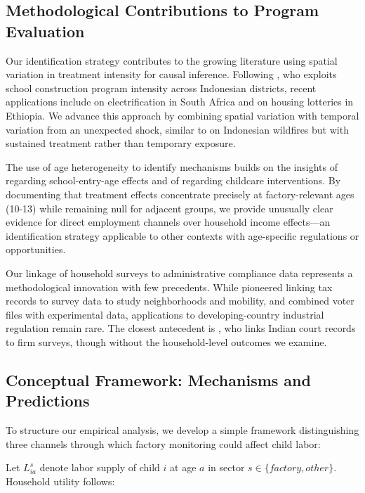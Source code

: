 \documentclass[12pt]{article}
\begin{document}
\subsection{Methodological Contributions to Program Evaluation}

Our identification strategy contributes to the growing literature using spatial variation in treatment intensity for causal inference. Following \citet{duflo2001schooling}, who exploits school construction program intensity across Indonesian districts, recent applications include \citet{dinkelman2011effects} on electrification in South Africa and \citet{franklin2018location} on housing lotteries in Ethiopia. We advance this approach by combining spatial variation with temporal variation from an unexpected shock, similar to \citet{jayachandran2009air} on Indonesian wildfires but with sustained treatment rather than temporary exposure.

The use of age heterogeneity to identify mechanisms builds on the insights of \citet{cascio2008first} regarding school-entry-age effects and of \citet{cornelissen2016benefits} regarding childcare interventions. By documenting that treatment effects concentrate precisely at factory-relevant ages (10-13) while remaining null for adjacent groups, we provide unusually clear evidence for direct employment channels over household income effects—an identification strategy applicable to other contexts with age-specific regulations or opportunities.

Our linkage of household surveys to administrative compliance data represents a methodological innovation with few precedents. While \citet{chetty2016effects} pioneered linking tax records to survey data to study neighborhoods and mobility, and \citet{berg2018individual} combined voter files with experimental data, applications to developing-country industrial regulation remain rare. The closest antecedent is \citet{adhvaryu2020light}, who links Indian court records to firm surveys, though without the household-level outcomes we examine.

\subsection{Conceptual Framework: Mechanisms and Predictions}

To structure our empirical analysis, we develop a simple framework distinguishing three channels through which factory monitoring could affect child labor:

Let $L_{ia}^s$ denote labor supply of child $i$ at age $a$ in sector $s \in \{factory, other\}$. Household utility follows:
\end{document}
